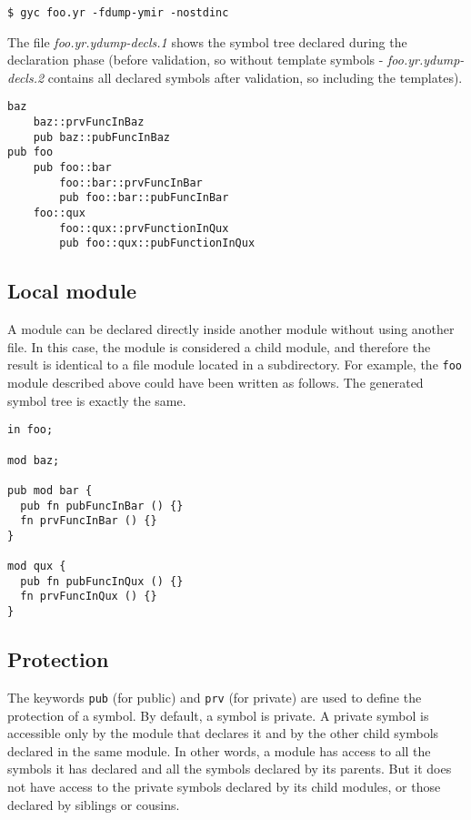 \begin{lstlisting}[style=intermediateVerb]
$ gyc foo.yr -fdump-ymir -nostdinc
\end{lstlisting}

The file \textit{foo.yr.ydump-decls.1} shows the symbol tree declared during the
declaration phase (before validation, so without template symbols -
\textit{foo.yr.ydump-decls.2} contains all declared symbols after validation, so
including the templates).

\begin{lstlisting}[style=intermediateVerb]
baz
    baz::prvFuncInBaz
    pub baz::pubFuncInBaz
pub foo
    pub foo::bar
        foo::bar::prvFuncInBar
        pub foo::bar::pubFuncInBar
    foo::qux
        foo::qux::prvFunctionInQux
        pub foo::qux::pubFunctionInQux
\end{lstlisting}

\subsection{Local module}

A module can be declared directly inside another module without using another
file. In this case, the module is considered a child module, and therefore the
result is identical to a file module located in a subdirectory. For example, the
\texttt{foo} module described above could have been written as follows. The
generated symbol tree is exactly the same.

\begin{minipage}{\linewidth}
\begin{lstlisting}[caption=\textit{./foo.yr}, style=coloredverbatim]
in foo;

mod baz;

pub mod bar {
  pub fn pubFuncInBar () {}
  fn prvFuncInBar () {}
}

mod qux {
  pub fn pubFuncInQux () {}
  fn prvFuncInQux () {}
}
\end{lstlisting}
\end{minipage}

\subsection{Protection}

The keywords \texttt{pub} (for public) and \texttt{prv} (for private) are used
to define the protection of a symbol. By default, a symbol is private. A private
symbol is accessible only by the module that declares it and by the other child
symbols declared in the same module. In other words, a module has access to all
the symbols it has declared and all the symbols declared by its parents. But it
does not have access to the private symbols declared by its child modules, or
those declared by siblings or cousins.

